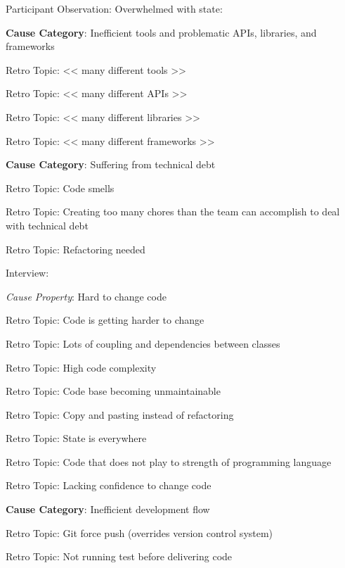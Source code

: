 \quad \quad Participant Observation: Overwhelmed with state: 

\quad \textbf{Cause Category}: Inefficient tools and problematic APIs, libraries, and frameworks

\quad \quad Retro Topic: << many different tools >>

\quad \quad Retro Topic: << many different APIs >>

\quad \quad Retro Topic: << many different libraries >>

\quad \quad Retro Topic: << many different frameworks >>

\quad \textbf{Cause Category}: Suffering from technical debt

\quad \quad Retro Topic: Code smells

\quad \quad Retro Topic: Creating too many chores than the team can accomplish to deal with technical debt

\quad \quad Retro Topic: Refactoring needed 

\quad \quad Interview: 

\quad \quad \textit{Cause Property}: Hard to change code

\quad \quad \quad Retro Topic: Code is getting harder to change

\quad \quad \quad Retro Topic: Lots of coupling and dependencies between classes

\quad \quad \quad Retro Topic: High code complexity

\quad \quad \quad Retro Topic: Code base becoming unmaintainable

\quad \quad \quad Retro Topic: Copy and pasting instead of refactoring

\quad \quad \quad Retro Topic: State is everywhere

\quad \quad \quad Retro Topic: Code that does not play to strength of programming language

\quad \quad \quad Retro Topic: Lacking confidence to change code

\quad \textbf{Cause Category}: Inefficient development flow

\quad \quad Retro Topic: Git force push (overrides version control system)

\quad \quad Retro Topic: Not running test before delivering code


